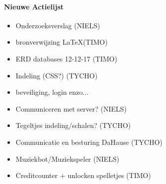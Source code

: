 \documentclass[11pt]{article}
\begin{document}
\paragraph{Nieuwe Actielijst}
\begin{itemize}
	\item Onderzoeksverslag (NIELS)
	\item bronverwijzing \LaTeX (TIMO)
	\item ERD databases 12-12-17 (TIMO)
	\item Indeling (CSS?) (TYCHO)
	\item beveiliging, login enzo... 
	\item Communiceren met server? (NIELS)
	\item Tegeltjes indeling/schalen? (TYCHO)
	\item Communicatie en besturing DaHause (TYCHO)
	\item Muziekbot/Muziekspeler (NIELS)
	\item Creditcounter + unlocken spelletjes (TIMO)
\end{itemize}
\end{document}
